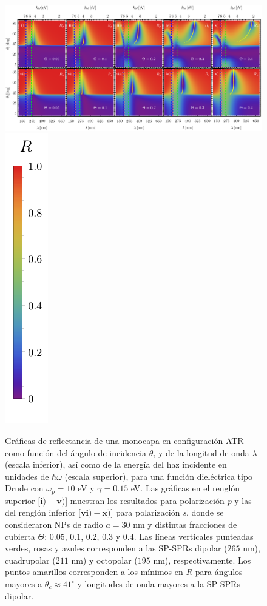   	\begin{figure}[h!]\centering
\includegraphics[width = .9\linewidth]{2-Resultados/figs/2-Wp10ThetaVar/0-2D_Grid.png}%
\includegraphics[scale=.85, trim={00 -5 00 00}, clip]{2-Resultados/figs/0-RBar_v}
	\caption{Gráficas de reflectancia de una monocapa en configuración ATR como función del ángulo de incidencia $\theta_i$ y de la longitud de onda $\lambda$ (escala inferior), así como de la energía del haz incidente en unidades de $\hbar\omega$ (escala superior), para una función dieléctrica tipo Drude con $\omega_p=10$ eV  y  $\gamma=0. 15$ eV.  Las gráficas   en el renglón superior [$\mathbf{i)-v)}$] muestran los resultados  para  polarización \emph{p} y las del renglón inferior  [$\mathbf{vi)-x)}$] para polarización  \emph{s}, donde se consideraron NPs de radio $a=30$ nm y distintas fracciones de cubierta $\Theta$: $0. 05$, $0. 1$, $0. 2$, $0. 3$ y $0. 4$. Las líneas verticales punteadas verdes, rosas y azules corresponden a las SP-SPRs dipolar ($265$ nm), cuadrupolar ($211$ nm) y octopolar ($195$ nm), respectivamente.  Los puntos amarillos corresponden a los mínimos en $R$ para ángulos mayores a $\theta_c\approx 41^\circ$ y longitudes de onda mayores a la SP-SPRs dipolar. }	\label{fig:R-ATR10}	
	\end{figure}		
	
